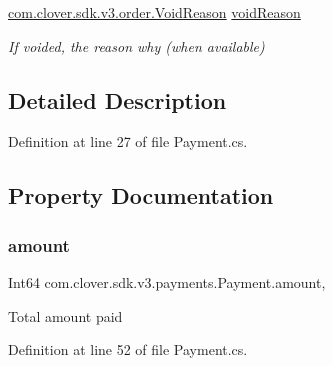\begin{DoxyCompactItemize}
\item 
\hyperlink{namespacecom_1_1clover_1_1sdk_1_1v3_1_1order_acb5aac0c1f6aeeb5b636223a69d2dec2}{com.\+clover.\+sdk.\+v3.\+order.\+Void\+Reason} \hyperlink{classcom_1_1clover_1_1sdk_1_1v3_1_1payments_1_1_payment_a037af65f45c8fd866641b93efb74cfb5}{void\+Reason}
\begin{DoxyCompactList}\small\item\em If voided, the reason why (when available) \end{DoxyCompactList}\end{DoxyCompactItemize}


\subsection{Detailed Description}


Definition at line 27 of file Payment.\+cs.



\subsection{Property Documentation}
\mbox{\label{classcom_1_1clover_1_1sdk_1_1v3_1_1payments_1_1_payment_a1fb932f232dd871adb368bd19dcd9ee3}} 
\subsubsection{\texorpdfstring{amount}{amount}}
{\footnotesize\ttfamily Int64 com.\+clover.\+sdk.\+v3.\+payments.\+Payment.\+amount\hspace{0.3cm}{\ttfamily [get]}, {\ttfamily [set]}}



Total amount paid 



Definition at line 52 of file Payment.\+cs.

\mbox{\label{classcom_1_1clover_1_1sdk_1_1v3_1_1payments_1_1_payment_a31305742a90feeadee5ed273822f8cd6}} 
